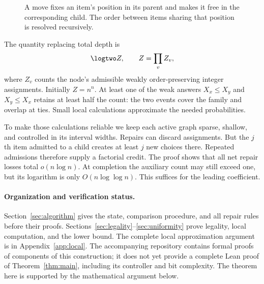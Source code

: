 \begin{figure}[t]
\centering
{}
\caption{A move fixes an item's position in its parent and makes it free in
the corresponding child. The order between items sharing that position is
resolved recursively.}
\label{fig:recursion}
\end{figure}

The quantity replacing total depth is
\[
           \logtwo Z,\qquad Z=\prod_v Z_v,
\]
where $Z_v$ counts the node's admissible weakly order-preserving integer
assignments. Initially $Z=n^n$. At least one of the weak answers
$X_x\leq X_y$ and $X_y\leq X_x$ retains at least half the count:
the two events cover the family and overlap at ties. Small local
calculations approximate the needed probabilities.

To make those calculations reliable we keep each active graph sparse,
shallow, and controlled in its interval widths. Repairs can discard
assignments. But the $j$th item admitted to a child creates at least $j$ new
choices there. Repeated admissions therefore supply a factorial credit.
The proof shows that all net repair losses total $o(n\log n)$.
At completion the auxiliary count may still exceed one, but its logarithm
is only $O(n\log\log n)$. This suffices for the leading coefficient.

\paragraph{Organization and verification status.}
Section~\ref{sec:algorithm} gives the state, comparison procedure, and all
repair rules before their proofs. Sections~\ref{sec:legality}--\ref{sec:uniformity}
prove legality, local computation, and the lower bound. The complete local
approximation argument is in Appendix~\ref{app:local}.
The accompanying repository contains formal proofs of components of this
construction; it does not yet provide a complete Lean proof of
Theorem~\ref{thm:main}, including its controller and bit complexity.
The theorem here is supported by the mathematical argument below.

